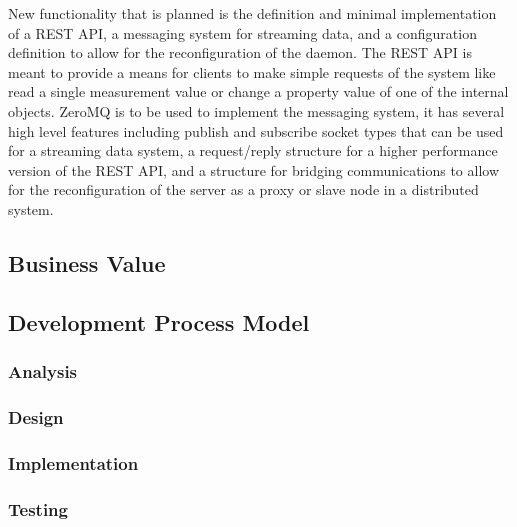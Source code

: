 \documentclass[11pt]{article}
\begin{document}
    New functionality that is planned is the definition and minimal
    implementation of a REST API, a messaging system for streaming data, and a
    configuration definition to allow for the reconfiguration of the daemon. The
    REST API is meant to provide a means for clients to make simple requests of
    the system like read a single measurement value or change a property value
    of one of the internal objects. ZeroMQ is to be used to implement the
    messaging system, it has several high level features including publish and
    subscribe socket types that can be used for a streaming data system, a
    request/reply structure for a higher performance version of the REST API,
    and a structure for bridging communications to allow for the reconfiguration
    of the server as a proxy or slave node in a distributed system.

    \subsection{Business Value}\label{sec:soln-val}

    \subsection{Development Process Model}\label{sec:soln-model}

      \subsubsection{Analysis}\label{sec:soln-model-analysis}

      \subsubsection{Design}\label{sec:soln-model-design}

      \subsubsection{Implementation}\label{sec:soln-model-implementation}

      \subsubsection{Testing}\label{sec:soln-model-testing}

\end{document}
